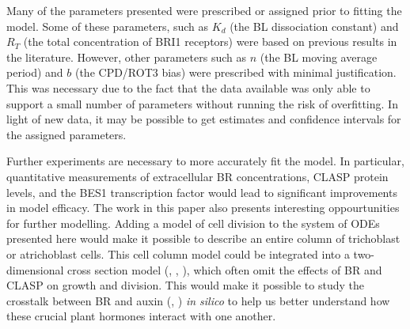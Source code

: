 Many of the parameters presented were prescribed or assigned prior to fitting the model. Some of these parameters, such as $K_{d}$ (the BL dissociation constant) and $R_{T}$ (the total concentration of BRI1 receptors) were based on previous results in the literature. However, other parameters such as $n$ (the BL moving average period) and $b$ (the CPD/ROT3 bias) were prescribed  with minimal justification. This was necessary due to the fact that the data available was only able to support a small number of parameters without running the risk of overfitting. In light of new data, it may be possible to get estimates and confidence intervals for the assigned parameters.

\medskip

Further experiments are necessary to more accurately fit the model. In particular, quantitative measurements of extracellular BR concentrations, CLASP protein levels, and the BES1 transcription factor would lead to significant improvements in model efficacy. The work in this paper also presents interesting oppourtunities for further modelling. Adding a model of cell division to the system of ODEs presented here would make it possible to describe an entire column of trichoblast or atrichoblast cells. This cell column model could be integrated into a two-dimensional cross section model (\cite{grieneisen2007}, \cite{dimambro2017}, \cite{salvi2020}), which often omit the effects of BR and CLASP on growth and division. This would make it possible to study the crosstalk between BR and auxin (\cite{chaiwanon2015}, \cite{vragovic2015}) \emph{in silico} to help us better understand how these crucial plant hormones interact with one another.


